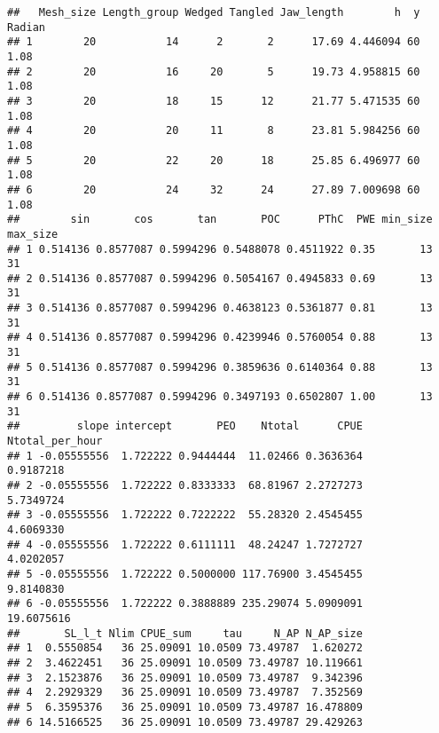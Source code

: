 \documentclass[]{article}
\newenvironment{Shaded}{\begin{snugshade}}{\end{snugshade}}
\newcommand{\KeywordTok}[1]{\textcolor[rgb]{0.13,0.29,0.53}{\textbf{#1}}}
\newcommand{\DataTypeTok}[1]{\textcolor[rgb]{0.13,0.29,0.53}{#1}}
\newcommand{\DecValTok}[1]{\textcolor[rgb]{0.00,0.00,0.81}{#1}}
\newcommand{\StringTok}[1]{\textcolor[rgb]{0.31,0.60,0.02}{#1}}
\newcommand{\CommentTok}[1]{\textcolor[rgb]{0.56,0.35,0.01}{\textit{#1}}}
\newcommand{\OperatorTok}[1]{\textcolor[rgb]{0.81,0.36,0.00}{\textbf{#1}}}
\newcommand{\NormalTok}[1]{#1}
\begin{document}
\begin{Shaded}
\end{Shaded}

\begin{verbatim}
##   Mesh_size Length_group Wedged Tangled Jaw_length        h  y Radian
## 1        20           14      2       2      17.69 4.446094 60   1.08
## 2        20           16     20       5      19.73 4.958815 60   1.08
## 3        20           18     15      12      21.77 5.471535 60   1.08
## 4        20           20     11       8      23.81 5.984256 60   1.08
## 5        20           22     20      18      25.85 6.496977 60   1.08
## 6        20           24     32      24      27.89 7.009698 60   1.08
##        sin       cos       tan       POC      PThC  PWE min_size max_size
## 1 0.514136 0.8577087 0.5994296 0.5488078 0.4511922 0.35       13       31
## 2 0.514136 0.8577087 0.5994296 0.5054167 0.4945833 0.69       13       31
## 3 0.514136 0.8577087 0.5994296 0.4638123 0.5361877 0.81       13       31
## 4 0.514136 0.8577087 0.5994296 0.4239946 0.5760054 0.88       13       31
## 5 0.514136 0.8577087 0.5994296 0.3859636 0.6140364 0.88       13       31
## 6 0.514136 0.8577087 0.5994296 0.3497193 0.6502807 1.00       13       31
##         slope intercept       PEO    Ntotal      CPUE Ntotal_per_hour
## 1 -0.05555556  1.722222 0.9444444  11.02466 0.3636364       0.9187218
## 2 -0.05555556  1.722222 0.8333333  68.81967 2.2727273       5.7349724
## 3 -0.05555556  1.722222 0.7222222  55.28320 2.4545455       4.6069330
## 4 -0.05555556  1.722222 0.6111111  48.24247 1.7272727       4.0202057
## 5 -0.05555556  1.722222 0.5000000 117.76900 3.4545455       9.8140830
## 6 -0.05555556  1.722222 0.3888889 235.29074 5.0909091      19.6075616
##       SL_l_t Nlim CPUE_sum     tau     N_AP N_AP_size
## 1  0.5550854   36 25.09091 10.0509 73.49787  1.620272
## 2  3.4622451   36 25.09091 10.0509 73.49787 10.119661
## 3  2.1523876   36 25.09091 10.0509 73.49787  9.342396
## 4  2.2929329   36 25.09091 10.0509 73.49787  7.352569
## 5  6.3595376   36 25.09091 10.0509 73.49787 16.478809
## 6 14.5166525   36 25.09091 10.0509 73.49787 29.429263
\end{verbatim}
\end{document}

